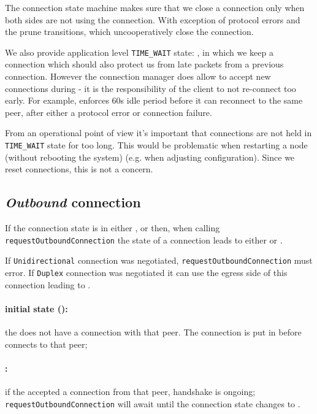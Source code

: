 The connection state machine makes sure that we close a connection only when
both sides are not using the connection. With exception of protocol errors and
the prune transitions, which uncooperatively close the connection.

We also provide application level \texttt{TIME\_WAIT} state:
\TerminatingState{}, in which we keep a connection which should also protect us
from late packets from a previous connection. However the connection manager
does allow to accept new connections during \TerminatingState{} - it is
the responsibility of the client to not re-connect too early. For example,
\ptopgov{} enforces 60s idle period before it can reconnect to the same peer, after
either a protocol error or connection failure.

From an operational point of view it's important that connections are not held in
\texttt{TIME\_WAIT} state for too long. This would be problematic when
restarting a node (without rebooting the system) (e.g. when adjusting
configuration). Since we reset connections, this is not a concern.

\subsection{\textit{Outbound} connection}

If the connection state is in either \ReservedOutboundState{}, \UnnegotiatedStateIn
or \InboundStateDup{} then, when calling \texttt{requestOutboundConnection} the state of a connection leads to
either \OutboundStateUni{} or \DuplexState{}.

If \texttt{Unidirectional} connection was
negotiated, \texttt{requestOutboundConnection} must error. If \texttt{Duplex}
connection was negotiated it can use the egress side of this connection leading
to \DuplexState{}.

\paragraph{\textnormal{initial state (\InitialState{})}:} the \connmngr{} does not have
  a connection with that peer. The connection is put in \ReservedOutboundState{}
  before \connmngr{} connects to that peer;

\paragraph{\UnnegotiatedStateIn{}:} if the \connmngr{} accepted
  a connection from that peer, handshake is ongoing;
  \texttt{requestOutboundConnection} will await until the connection state
  changes to \InboundStateAny{}.

